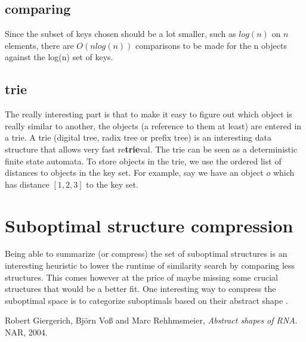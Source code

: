\documentclass[a4paper, 12pt] {article}
\begin{document}
\subsection*{comparing}
Since the subset of keys chosen should be a lot smaller, such as $log(n)$ on $n$ elements, there are $O(nlog(n))$ comparisons to be made 
for the n objects against the log(n) set of keys.
\subsection*{trie}
The really interesting part is that to make it easy to figure out which object is really similar to another, the objects (a reference to them at least)
are entered in a trie. A trie (digital tree, radix tree or prefix tree) is an interesting data structure that allows very fast re{\bf{trie}}val. The trie can
be seen as a deterministic finite state automata. To store objects in the trie, we use the ordered list of distances to objects in the key set. 
For example, say we have an object $o$ which has distance $[1,2,3]$ to the key set.


\section*{Suboptimal structure compression}
Being able to summarize (or compress) the set of suboptimal structures is an interesting heuristic to lower the
runtime of similarity search by comparing less structures. This comes however at the price of maybe missing 
some crucial structures that would be a better fit.
One interesting way to compress the suboptimal space is to categorize suboptimals based on their abstract shape \cite{abstractShapes2004}.


\todo[inline]

\begin{thebibliography}{42}

  Robert Giergerich, Bj{\"o}rn Vo{\ss} and Marc Rehhmsmeier,
  \emph{Abstract shapes of RNA}.
  NAR,
  2004.

\end{thebibliography}
\end{document}
